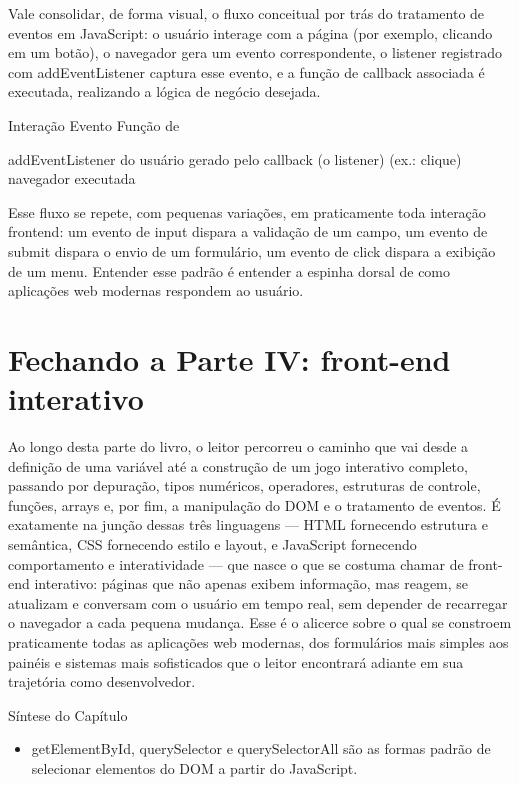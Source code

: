 Vale consolidar, de forma visual, o fluxo conceitual por trás do tratamento de eventos em JavaScript: o usuário interage com a página (por exemplo, clicando em um botão), o navegador gera um evento correspondente, o listener registrado com addEventListener captura esse evento, e a função de callback associada é executada, realizando a lógica de negócio desejada.

Interação Evento Função de

\begin{infobox}{addEventListener}
do usuário gerado pelo callback (o listener) (ex.: clique) navegador executada
\end{infobox}

Esse fluxo se repete, com pequenas variações, em praticamente toda interação frontend: um evento de input dispara a validação de um campo, um evento de submit dispara o envio de um formulário, um evento de click dispara a exibição de um menu. Entender esse padrão é entender a espinha dorsal de como aplicações web modernas respondem ao usuário.

\section{Fechando a Parte IV: front-end interativo}

Ao longo desta parte do livro, o leitor percorreu o caminho que vai desde a definição de uma variável até a construção de um jogo interativo completo, passando por depuração, tipos numéricos, operadores, estruturas de controle, funções, arrays e, por fim, a manipulação do DOM e o tratamento de eventos. É exatamente na junção dessas três linguagens — HTML fornecendo estrutura e semântica, CSS fornecendo estilo e layout, e JavaScript fornecendo comportamento e interatividade — que nasce o que se costuma chamar de front-end interativo: páginas que não apenas exibem informação, mas reagem, se atualizam e conversam com o usuário em tempo real, sem depender de recarregar o navegador a cada pequena mudança. Esse é o alicerce sobre o qual se constroem praticamente todas as aplicações web modernas, dos formulários mais simples aos painéis e sistemas mais sofisticados que o leitor encontrará adiante em sua trajetória como desenvolvedor.

Síntese do Capítulo

\begin{itemize}
  \item getElementById, querySelector e querySelectorAll são as formas padrão de selecionar elementos do DOM a partir do JavaScript.
\end{itemize}

